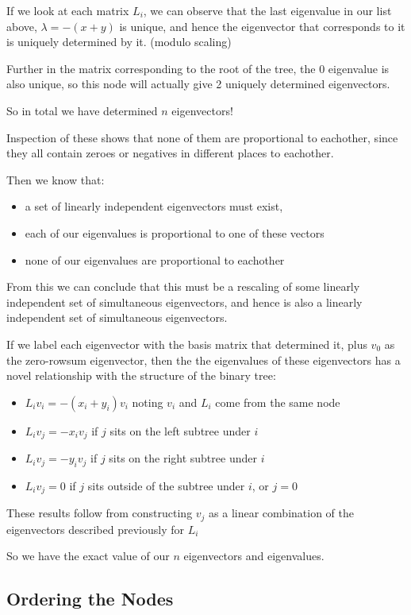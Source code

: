 \documentclass{article}
\begin{document}
If we look at each matrix $L_i$, we can observe that the last eigenvalue in our
list above, $\lambda = -(x + y)$ is unique, and hence the eigenvector that
corresponds to it is uniquely determined by it. (modulo scaling)

Further in the matrix corresponding to the root of the tree, the $0$ eigenvalue
is also unique, so this node will actually give 2 uniquely determined
eigenvectors.

So in total we have determined $n$ eigenvectors!

Inspection of these shows that none of them are proportional to eachother,
since they all contain zeroes or negatives in different places to eachother.

Then we know that:
\begin{itemize}
	\item a set of linearly independent eigenvectors must exist,
	\item each of our eigenvalues is proportional to one of these vectors
	\item none of our eigenvalues are proportional to eachother
\end{itemize}
From this we can conclude that this must be a rescaling of some linearly
independent set of simultaneous eigenvectors, and hence is also a linearly
independent set of simultaneous eigenvectors.

If we label each eigenvector with the basis matrix that determined it, plus
$v_0$ as the zero-rowsum eigenvector, then the the eigenvalues of these
eigenvectors has a novel relationship with the structure of the binary tree:
\begin{itemize}
	\item ${L_i}{v_i} = -(x_i + y_i)v_i$ noting $v_i$ and $L_i$ come from the
		same node
	\item ${L_i}{v_j} = -{x_i}{v_j}$ if $j$ sits on the left subtree under $i$
	\item ${L_i}{v_j} = -{y_i}{v_j}$ if $j$ sits on the right subtree under $i$
	\item ${L_i}{v_j} = 0$ if $j$ sits outside of the subtree under $i$,
		or $j=0$
\end{itemize}

These results follow from constructing $v_j$ as a linear combination of the
eigenvectors described previously for $L_i$

So we have the exact value of our $n$ eigenvectors and eigenvalues.

\subsection{Ordering the Nodes}
\end{document}
